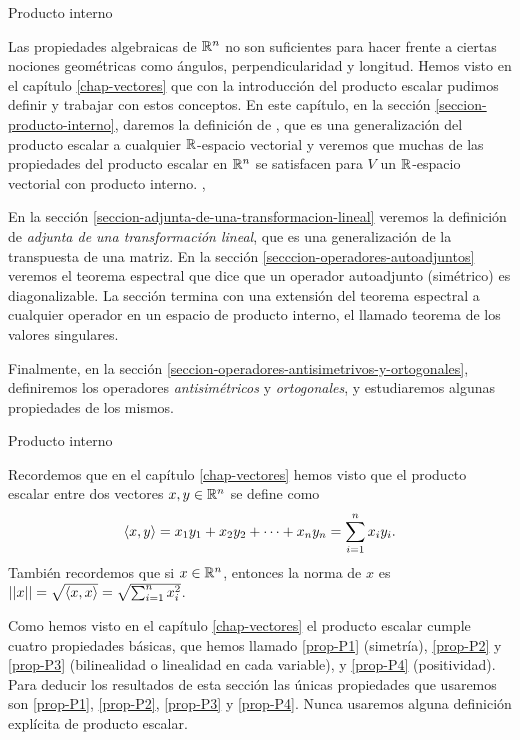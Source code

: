    \begin{chapter}{Producto interno}\label{chap-esp-prod-int}
    

    Las propiedades algebraicas de $\mathbb R^n$ no son suficientes para hacer frente a ciertas nociones geométricas  como  ángulos, perpendicularidad y longitud. Hemos visto en el  capítulo \ref{chap-vectores} que con la introducción del producto escalar pudimos definir y  trabajar  con estos conceptos. En  este capítulo,  en la sección \ref{seccion-producto-interno},  daremos la definición de , que es una generalización del producto escalar a cualquier $\mathbb R$-espacio vectorial y veremos que muchas de las propiedades del producto escalar en $\mathbb R^n$  se satisfacen para $V$ un $\mathbb R$-espacio vectorial con producto interno. ,
    
    En la sección \ref{seccion-adjunta-de-una-transformacion-lineal} veremos la  definición de \textit{adjunta de una transformación lineal},  que es una generalización de la transpuesta de una matriz. En la sección \ref{secccion-operadores-autoadjuntos} veremos el teorema espectral que dice que  un operador autoadjunto (simétrico) es diagonalizable. La sección   termina con una extensión del teorema espectral a cualquier operador en un espacio de producto interno, el llamado  teorema de los valores singulares.  
    
    Finalmente,  en la sección \ref{seccion-operadores-antisimetrivos-y-ortogonales}, definiremos los operadores \textit{antisimétricos} y \textit{ortogonales}, y estudiaremos algunas propiedades de los mismos. 
    
    



    \begin{section}{Producto interno}\label{seccion-producto-interno}
        
        Recordemos que en el  capítulo \ref{chap-vectores} hemos visto que el producto escalar entre dos vectores $x,y \in \mathbb R^n$ se define como
        \begin{equation*}
            \langle x,y\rangle = x_1y_1 + x_2y_2+\cdots+x_ny_n = \sum_{i=1}^{n} x_iy_i.
        \end{equation*}
        También recordemos que si  $x \in \mathbb R^n$,  entonces la norma de $x$ es $||x|| = \sqrt{\langle x,x\rangle} = \sqrt{ \sum_{i=1}^{n} x_i^2}$.
        
        Como hemos visto en  el capítulo \ref{chap-vectores} el producto escalar  cumple cuatro propiedades básicas,  que hemos llamado \ref{prop-P1} (simetría), \ref{prop-P2} y \ref{prop-P3} (bilinealidad o linealidad en cada variable), y \ref{prop-P4} (positividad).  Para deducir los resultados de esta sección las únicas propiedades que usaremos son  \ref{prop-P1}, \ref{prop-P2}, \ref{prop-P3} y \ref{prop-P4}. Nunca usaremos alguna  definición explícita de producto escalar. 
        

\end{section}
\end{chapter}
